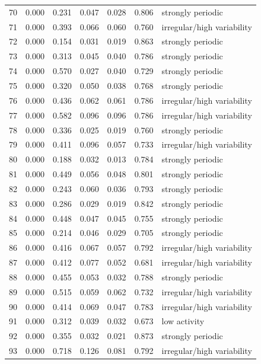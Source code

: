 \begin{longtable}{lrrrrrl}
70 & 0.000 & 0.231 & 0.047 & 0.028 & 0.806 & strongly periodic \\
71 & 0.000 & 0.393 & 0.066 & 0.060 & 0.760 & irregular/high variability \\
72 & 0.000 & 0.154 & 0.031 & 0.019 & 0.863 & strongly periodic \\
73 & 0.000 & 0.313 & 0.045 & 0.040 & 0.786 & strongly periodic \\
74 & 0.000 & 0.570 & 0.027 & 0.040 & 0.729 & strongly periodic \\
75 & 0.000 & 0.320 & 0.050 & 0.038 & 0.768 & strongly periodic \\
76 & 0.000 & 0.436 & 0.062 & 0.061 & 0.786 & irregular/high variability \\
77 & 0.000 & 0.582 & 0.096 & 0.096 & 0.786 & irregular/high variability \\
78 & 0.000 & 0.336 & 0.025 & 0.019 & 0.760 & strongly periodic \\
79 & 0.000 & 0.411 & 0.096 & 0.057 & 0.733 & irregular/high variability \\
80 & 0.000 & 0.188 & 0.032 & 0.013 & 0.784 & strongly periodic \\
81 & 0.000 & 0.449 & 0.056 & 0.048 & 0.801 & strongly periodic \\
82 & 0.000 & 0.243 & 0.060 & 0.036 & 0.793 & strongly periodic \\
83 & 0.000 & 0.286 & 0.029 & 0.019 & 0.842 & strongly periodic \\
84 & 0.000 & 0.448 & 0.047 & 0.045 & 0.755 & strongly periodic \\
85 & 0.000 & 0.214 & 0.046 & 0.029 & 0.705 & strongly periodic \\
86 & 0.000 & 0.416 & 0.067 & 0.057 & 0.792 & irregular/high variability \\
87 & 0.000 & 0.412 & 0.077 & 0.052 & 0.681 & irregular/high variability \\
88 & 0.000 & 0.455 & 0.053 & 0.032 & 0.788 & strongly periodic \\
89 & 0.000 & 0.515 & 0.059 & 0.062 & 0.732 & irregular/high variability \\
90 & 0.000 & 0.414 & 0.069 & 0.047 & 0.783 & irregular/high variability \\
91 & 0.000 & 0.312 & 0.039 & 0.032 & 0.673 & low activity \\
92 & 0.000 & 0.355 & 0.032 & 0.021 & 0.873 & strongly periodic \\
93 & 0.000 & 0.718 & 0.126 & 0.081 & 0.792 & irregular/high variability \\

\end{longtable}
